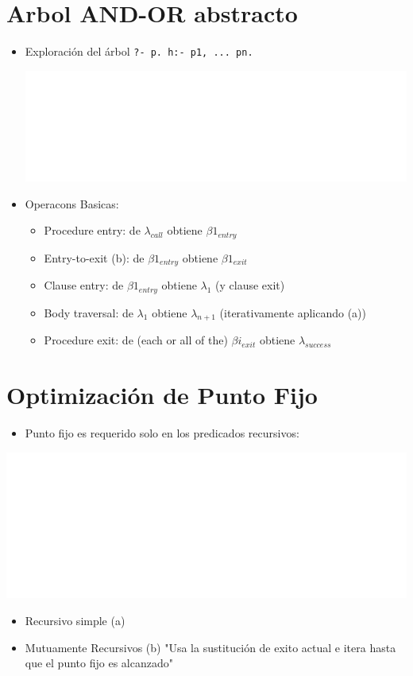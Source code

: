 \documentclass[11pt]{article}
\begin{document}
\section*{Arbol AND-OR abstracto}
\label{sec:orga37ef83}
\begin{itemize}
\item Exploración del árbol \texttt{?- p.   h:- p1, ... pn.}
\begin{center}
\includegraphics[width=.9\linewidth]{arbolandor2.png}
\end{center}
\item Operacons Basicas:
\begin{itemize}
\item Procedure entry: de \(\lambda_{call}\) obtiene \(\beta1_{entry}\)
\item Entry-to-exit (b): de \(\beta1_{entry}\) obtiene \(\beta1_{exit}\)
\item Clause entry: de \(\beta1_{entry}\) obtiene \(\lambda_1\)     (y clause exit)
\item Body traversal: de \(\lambda_1\) obtiene \(\lambda_{n+1}\)  (iterativamente aplicando (a))
\item Procedure exit: de (each or all of the) \(\beta{i}_{exit}\) obtiene \(\lambda_{success}\)
\end{itemize}
\end{itemize}

\section*{Optimización de Punto Fijo}
\label{sec:orgd23c189}
\begin{itemize}
\item Punto fijo es requerido solo en los predicados recursivos:
\end{itemize}
\begin{center}
\includegraphics[width=.9\linewidth]{arbolrec2.png}
\end{center}
\begin{itemize}
\item Recursivo simple (a)
\item Mutuamente Recursivos (b)
 "Usa la sustitución de exito actual e itera hasta que el punto fijo
es alcanzado"
\end{itemize}
\end{document}
